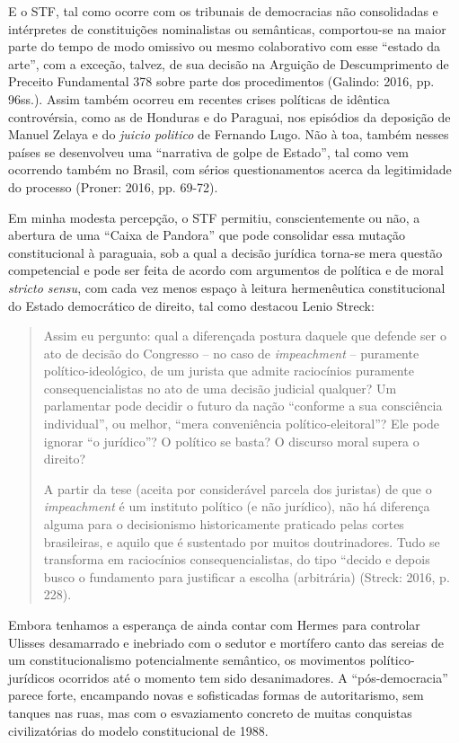 E o STF, tal como ocorre com os tribunais de democracias não
consolidadas e intérpretes de constituições nominalistas ou semânticas,
comportou-se na maior parte do tempo de modo omissivo ou mesmo
colaborativo com esse ``estado da arte'', com a exceção, talvez, de sua
decisão na Arguição de Descumprimento de Preceito Fundamental 378 sobre
parte dos procedimentos (Galindo: 2016, pp. 96ss.). Assim também ocorreu
em recentes crises políticas de idêntica controvérsia, como as de
Honduras e do Paraguai, nos episódios da deposição de Manuel Zelaya e do
\emph{juicio politico} de Fernando Lugo. Não à toa, também nesses países
se desenvolveu uma ``narrativa de golpe de Estado'', tal como vem
ocorrendo também no Brasil, com sérios questionamentos acerca da
legitimidade do processo (Proner: 2016, pp. 69-72).

Em minha modesta percepção, o STF permitiu, conscientemente ou não, a
abertura de uma ``Caixa de Pandora'' que pode consolidar essa mutação
constitucional à paraguaia, sob a qual a decisão jurídica torna-se mera
questão competencial e pode ser feita de acordo com argumentos de
política e de moral \emph{stricto sensu}, com cada vez menos espaço à
leitura hermenêutica constitucional do Estado democrático de direito,
tal como destacou Lenio Streck:

\begin{quote}
Assim eu pergunto: qual a diferençada postura daquele que defende ser o
ato de decisão do Congresso -- no caso de \emph{impeachment} --
puramente político-ideológico, de um jurista que admite raciocínios
puramente consequencialistas no ato de uma decisão judicial qualquer? Um
parlamentar pode decidir o futuro da nação ``conforme a sua consciência
individual'', ou melhor, ``mera conveniência político-eleitoral''? Ele
pode ignorar ``o jurídico''? O político se basta? O discurso moral
supera o direito?

A partir da tese (aceita por considerável parcela dos juristas) de que o
\emph{impeachment} é um instituto político (e não jurídico), não há
diferença alguma para o decisionismo historicamente praticado pelas
cortes brasileiras, e aquilo que é sustentado por muitos doutrinadores.
Tudo se transforma em raciocínios consequencialistas, do tipo ``decido e
depois busco o fundamento para justificar a escolha (arbitrária)
(Streck: 2016, p. 228).
\end{quote}

Embora tenhamos a esperança de ainda contar com Hermes para controlar
Ulisses desamarrado e inebriado com o sedutor e mortífero canto das
sereias de um constitucionalismo potencialmente semântico, os movimentos
político-jurídicos ocorridos até o momento tem sido desanimadores. A
``pós-democracia'' parece forte, encampando novas e sofisticadas formas
de autoritarismo, sem tanques nas ruas, mas com o esvaziamento concreto
de muitas conquistas civilizatórias do modelo constitucional de 1988.

